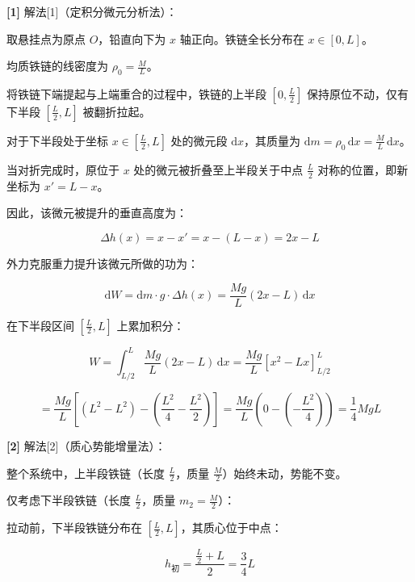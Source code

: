 \documentclass[11pt,a4paper,UTF8]{ctexart}
\begin{document}
\begin{solbox}[分步推导与答题规范]
\textbf{[1]} 解法[1]（定积分微元分析法）：

取悬挂点为原点 $O$，铅直向下为 $x$ 轴正向。铁链全长分布在 $x \in [0, L]$。

均质铁链的线密度为 $\rho_0 = \frac{M}{L}$。

将铁链下端提起与上端重合的过程中，铁链的上半段 $[0, \frac{L}{2}]$ 保持原位不动，仅有下半段 $[\frac{L}{2}, L]$ 被翻折拉起。

对于下半段处于坐标 $x \in [\frac{L}{2}, L]$ 处的微元段 $\mathrm{d}x$，其质量为 $\mathrm{d}m = \rho_0\,\mathrm{d}x = \frac{M}{L}\,\mathrm{d}x$。

当对折完成时，原位于 $x$ 处的微元被折叠至上半段关于中点 $\frac{L}{2}$ 对称的位置，即新坐标为 $x' = L - x$。

因此，该微元被提升的垂直高度为：


\begin{equation*}
\Delta h(x) = x - x' = x - (L - x) = 2x - L
\end{equation*}


外力克服重力提升该微元所做的功为：


\begin{equation*}
\mathrm{d}W = \mathrm{d}m \cdot g \cdot \Delta h(x) = \frac{M g}{L}(2x - L)\,\mathrm{d}x
\end{equation*}


在下半段区间 $[\frac{L}{2}, L]$ 上累加积分：


\begin{equation*}
W = \int_{L/2}^L \frac{M g}{L}(2x - L)\,\mathrm{d}x = \frac{M g}{L} \left[x^2 - L x\right]_{L/2}^L
\end{equation*}



\begin{equation*}
= \frac{M g}{L} \left[(L^2 - L^2) - \left(\frac{L^2}{4} - \frac{L^2}{2}\right)\right] = \frac{M g}{L} \left(0 - \left(-\frac{L^2}{4}\right)\right) = \frac{1}{4}M g L
\end{equation*}


\textbf{[2]} 解法[2]（质心势能增量法）：

整个系统中，上半段铁链（长度 $\frac{L}{2}$，质量 $\frac{M}{2}$）始终未动，势能不变。

仅考虑下半段铁链（长度 $\frac{L}{2}$，质量 $m_2 = \frac{M}{2}$）：

拉动前，下半段铁链分布在 $[\frac{L}{2}, L]$，其质心位于中点：


\begin{equation*}
h_{\text{初}} = \frac{\frac{L}{2} + L}{2} = \frac{3}{4}L
\end{equation*}



\end{solbox}
\end{document}
